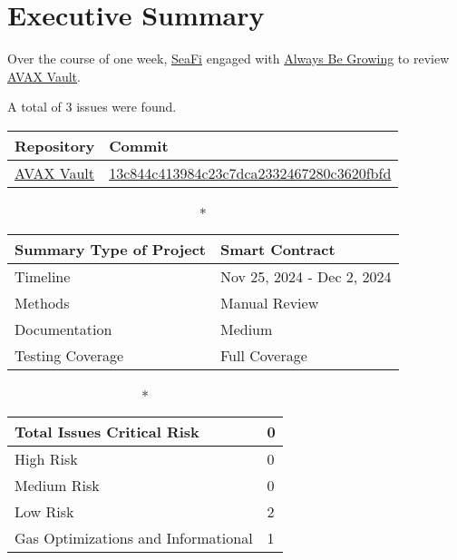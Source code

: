 \hypertarget{executive-summary}{%
\section{Executive Summary}\label{executive-summary}}

Over the course of one week, \href{https://seafi.app}{SeaFi} engaged with
\href{http://abg.garden}{Always Be Growing} to review
\href{https://github.com/SeaFi-Labs/AVAX-Vault}{AVAX Vault}. 

A total of 3 issues were found. 

\begin{longtable}[c]{|l|l|}
\hline \textbf{Repository} & \textbf{Commit} \\

\hline
\href{https://github.com/SeaFi-Labs/AVAX-Vault}{AVAX Vault} &
\href{https://github.com/SeaFi-Labs/AVAX-Vault/commit/13c844c413984c23c7dca2332467280c3620fbfd}{13c844c413984c23c7dca2332467280c3620fbfd} \\
\hline
\end{longtable}

\begin{longtable}[]{|l|l|}

\caption*{\textbf{Summary}}
\hline Type of Project & Smart Contract \\   
\hline Timeline & Nov 25, 2024 - Dec 2, 2024   \\
\hline Methods & Manual Review \\
\hline Documentation & Medium \\
\hline Testing Coverage & Full Coverage \\
\hline
\end{longtable}


\begin{longtable}[]{|l|l|}
\caption*{\textbf{Total Issues}}
\hline Critical Risk & 0 \\
\hline High Risk & 0 \\
\hline Medium Risk & 0 \\ 
\hline Low Risk & 2 \\
\hline Gas Optimizations and Informational & 1 \\
\hline
\end{longtable}

